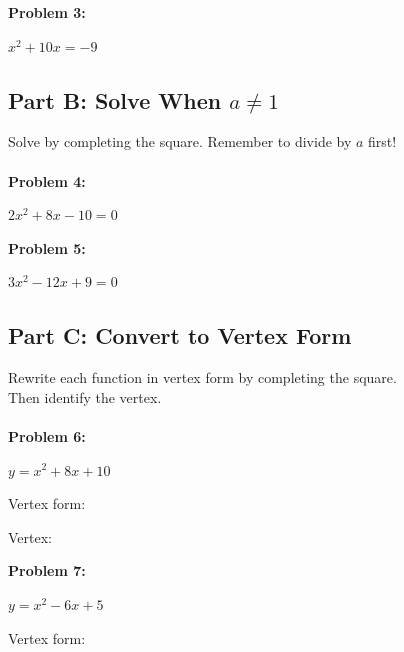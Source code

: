 \documentclass[12pt]{article}
\begin{document}
			\textbf{Problem 3:}
            
            $x^2 + 10x = -9$

			\newpage

		\subsection*{Part B: Solve When $a \neq 1$}

			Solve by completing the square. Remember to divide by $a$ first!\\\\

			\textbf{Problem 4:}
            
            $2x^2 + 8x - 10 = 0$

			\vspace{6cm}

			\textbf{Problem 5:}
            
            $3x^2 - 12x + 9 = 0$

			\newpage

		\subsection*{Part C: Convert to Vertex Form}

			Rewrite each function in vertex form by completing the square.\\

			Then identify the vertex.\\\\

			\textbf{Problem 6:}
            
            $y = x^2 + 8x + 10$

			\vspace{4cm}

			Vertex form: \underline{\hspace{3in}}

			\vspace{1cm}

			Vertex: \underline{\hspace{2in}}

			\vspace{1cm}

			\textbf{Problem 7:}
            
            $y = x^2 - 6x + 5$

			\vspace{4cm}

			Vertex form: \underline{\hspace{3in}}
\end{document}

